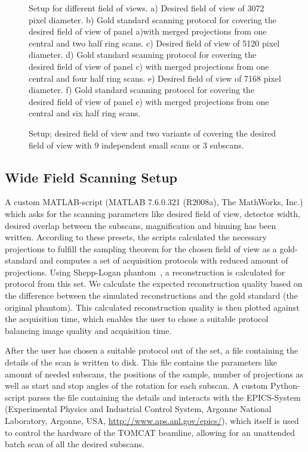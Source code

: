 \ifiucr
	\begin{figure}%
		\centering%
		\caption{Setup for different field of views. %
		a) Desired field of view of 3072 pixel diameter. %
		b) Gold standard scanning protocol for covering the desired field of view of panel a)with merged projections from one central and two half ring scans. %
		c) Desired field of view of 5120 pixel diameter. %
		d) Gold standard scanning protocol for covering the desired field of view of panel c) with merged projections from one central and four half ring scans. %
		e) Desired field of view of 7168 pixel diameter. %
		f) Gold standard scanning protocol for covering the desired field of view of panel e) with merged projections from one central and six half ring scans. %
		}%
		
		\label{fig:SubScan-Setup}%
	\end{figure}%
\else
	\begin{figure*}[htp]
		\centering%
		
		\caption{Setup; desired field of view and two variants of covering the desired field of view with 9 independent small scans or 3 subscans.}%
		\label{fig:SubScan-Setup}%
	\end{figure*}
\fi

\subsection{Wide Field Scanning Setup}%
\label{subsec:wfs-setup}%
A custom MATLAB-script (MATLAB\textsuperscript{\textregistered} 7.6.0.321 (R2008a), The MathWorks, Inc.) which asks for the scanning parameters like desired field of view, detector width, desired overlap between the subscans, magnification and binning has been written. According to these presets, the scripts calculated the necessary projections to fulfill the sampling theorem for the chosen field of view as a gold-standard and computes a set of acquisition protocols with reduced amount of projections. Using Shepp-Logan phantom~\cite{Shepp1974}, a reconstruction is calculated for protocol from this set. We calculate the expected reconstruction quality based on the difference between the simulated reconstructions and the gold standard (the original phantom). This calculated reconstruction quality is then plotted against the acquisition time, which enables the user to chose a suitable protocol balancing image quality and acquisition time.

After the user has chosen a suitable protocol out of the set, a file containing the details of the scan is written to disk. This file contains the parameters like amount of needed subscans, the positions of the sample, number of projections as well as start and stop angles of the rotation for each subscan. A custom Python-script parses the file containing the details and interacts with the EPICS-System (Experimental Physics and Industrial Control System, Argonne National Laboratory, Argonne, USA, \url{http://www.aps.anl.gov/epics/}), which itself is used to control the hardware of the TOMCAT beamline, allowing for an unattended batch scan of all the desired subscans.

